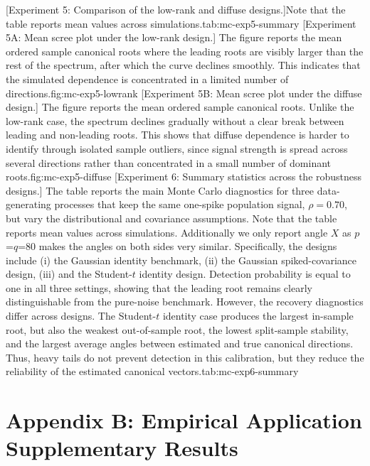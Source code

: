 \documentclass[12pt]{report} %
\begin{document}
[Experiment 5: Comparison of the low-rank and diffuse designs.]{Note that the table reports mean values across simulations.}{tab:mc-exp5-summary}
[Experiment 5A: Mean scree plot under the low-rank design.]{
The figure reports the mean ordered sample canonical roots where the leading roots are visibly 
larger than the rest of the spectrum, after which the curve declines smoothly. This indicates 
that the simulated dependence is concentrated in a limited number of directions.}{fig:mc-exp5-lowrank}
[Experiment 5B: Mean scree plot under the diffuse design.]{
The figure reports the mean ordered sample canonical roots. Unlike the low-rank case, the 
spectrum declines gradually without a clear break between leading and non-leading roots. 
This shows that diffuse dependence is harder to identify through isolated sample outliers, 
since signal strength is spread across several directions rather than concentrated in a 
small number of dominant roots.}{fig:mc-exp5-diffuse}
[Experiment 6: Summary statistics across the robustness designs.]{
The table reports the main Monte Carlo diagnostics for three data-generating processes that keep the 
same one-spike population signal, \(\rho=0.70\), but vary the distributional and covariance assumptions. 
Note that the table reports mean values across simulations. Additionally we only report angle $X$ as $p$=$q$=80 
makes the angles on both sides very similar.
Specifically, the designs include (i) the Gaussian identity benchmark, (ii) the Gaussian spiked-covariance design, 
(iii) and the Student-\(t\) identity design. Detection probability is equal to one in all three settings, 
showing that the leading root remains clearly distinguishable from the pure-noise benchmark. 
However, the recovery diagnostics differ across designs. 
The Student-\(t\) identity case produces the largest in-sample root, but also the weakest 
out-of-sample root, the lowest split-sample stability, and the largest average angles between 
estimated and true canonical directions. 
Thus, heavy tails do not prevent detection in this calibration, but they reduce the reliability 
of the estimated canonical vectors.}{tab:mc-exp6-summary}

\clearpage
{}
\section*{Appendix B: Empirical Application Supplementary Results}
\label{app:emp-results}
\end{document}
